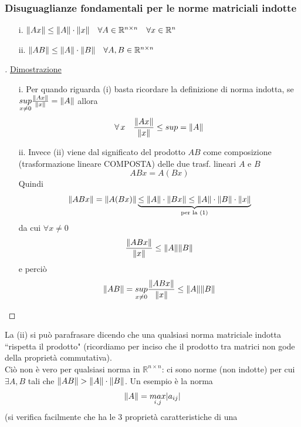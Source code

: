 \subsubsection{Disuguaglianze fondamentali per le norme matriciali indotte}
\begin{enumerate}
    \item[i.] $\lVert Ax\rVert \le \lVert A\rVert \cdot \lVert x\rVert \quad \forall A \in \mathbb{R}^{n \times n} \quad \forall x \in \mathbb{R}^n$
    
    \item[ii.] $\lVert AB\rVert \le \lVert A\rVert \cdot \lVert B\rVert \quad \forall A, B \in \mathbb{R}^{n \times n}$
\end{enumerate}


\begin{proof}[\unskip\nopunct]
\uline{Dimostrazione}
\begin{enumerate}
\item[i.] Per quando riguarda (i) basta ricordare la definizione di norma
indotta, se $\underset{x \neq 0}{sup} \frac{\lVert Ax\rVert}{\lVert x\rVert} = \lVert A\rVert$ allora 
\[\forall \, x \quad \frac{\lVert Ax\rVert}{\lVert x\rVert} \le sup = \lVert A\rVert\]

\item[ii.] Invece (ii) viene dal significato del prodotto $AB$ come composizione (trasformazione lineare COMPOSTA) delle due trasf. lineari $A$ e $B$
\[ABx = A(Bx)\]
Quindi
\[\lVert ABx\rVert = \lVert A(Bx)\rVert \underbrace{\le \lVert A\rVert \cdot \lVert Bx\rVert \le \lVert A\rVert \cdot \lVert B\rVert \cdot \lVert x\rVert}_{\text{per la (1)}}\]
da cui $\forall x \ne 0$
\[\frac{\lVert ABx\rVert}{\lVert x\rVert} \le \lVert A\rVert \lVert B\rVert\]
e perciò
\[\lVert AB\rVert = \underset{x \neq 0}{sup} \frac{\lVert ABx\rVert}{\lVert x\rVert} \le \lVert A\rVert \lVert B\rVert\]
\end{enumerate}
\end{proof}
La (ii) si può parafrasare dicendo che una qualsiasi norma matriciale indotta ``rispetta il prodotto" (ricordiamo per inciso che il prodotto tra matrici non gode della proprietà commutativa).\\ Ciò non è vero per qualsiasi norma in $\mathbb{R}^{n\times n}$: ci sono norme (non indotte) per cui $\exists A,B$ tali che $\lVert AB\rVert>\lVert A\rVert\cdot\lVert B\rVert$. Un esempio è la norma
\begin{equation*}
    \lVert A\rVert=\underset{i,j}{max}|a_{ij}|
\end{equation*}
(si verifica facilmente che ha le 3 proprietà caratteristiche di una

